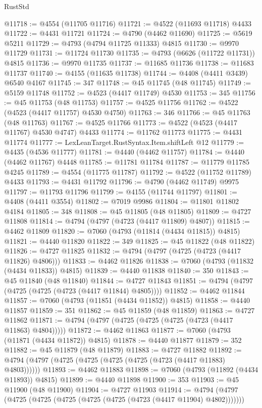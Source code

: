 \begin{lexlean}{RustStd}
\begin{coremodule}
{\begin{coremodule}
{{{{{{{{{{{{{{{{{{{{{{{{{{{{{{{{{{{{{{{{{{{{{{{{{{{{{{{{{{{{@11718 := @4554 (@11705 @11716)
@11721 := @4522 (@11693 @11718) @4433
@11722 := @4431 @11721
@11724 := @4790 (@4462 @11690)
@11725 := @5619 @5211
@11729 := @4793 (@4794 @11725 @11333) @4815
@11730 := @9970 @11729
@11731 := @11724 @11730
@11735 := @4793 (@6626 (@11722 @11731)) @4815
@11736 := @9970 @11735
@11737 := @11685 @11736
@11738 := @11683 @11737
@11740 := @4155 (@11635 @11738)
@11744 := @4408 (@4411 @3439) @6540 @4167
@11745 := 347
@11748 := @45 @11745 (@48 @11745)
@11749 := @5159 @11748
@11752 := @4523 (@4417 @11749) @4530
@11753 := 345
@11756 := @45 @11753 (@48 @11753)
@11757 := @4525 @11756
@11762 := @4522 (@4523 (@4417 @11757) @4530 @4750)
@11763 := 346
@11766 := @45 @11763 (@48 @11763)
@11767 := @4525 @11766
@11773 := @4522 (@4523 (@4417 @11767) @4530 @4747) @4433
@11774 := @11762 @11773
@11775 := @4431 @11774
@11777 := LexLeanTarget.RustSyntax.Item.shiftLeft @12
@11779 := @4435 (@4536 @11777)
@11781 := @4440 (@4462 @11757)
@11784 := @4440 (@4462 @11767) @4448
@11785 := @11781 @11784
@11787 := @11779 @11785 @4245
@11789 := @4554 (@11775 @11787)
@11792 := @4522 (@11752 @11789) @4433
@11793 := @4431 @11792
@11796 := @4790 (@4462 @11749) @9975
@11797 := @11793 @11796
@11799 := @4155 (@11744 @11797)
@11801 := @4408 (@4411 @3554)
@11802 := @7019 @9986
@11804 := @11801 @11802 @4184
@11805 := 348
@11808 := @45 @11805 (@48 @11805)
@11809 := @4727 @11808
@11814 := @4794 (@4797 (@4723 (@4417 @11809) @4807))
@11815 := @4462 @11809
@11820 := @7060 (@4793 (@11814 (@4434 @11815)) @4815)
@11821 := @4440 @11820
@11822 := 349
@11825 := @45 @11822 (@48 @11822)
@11826 := @4727 @11825
@11832 := @4794 (@4797 (@4725 (@4723 (@4417 @11826) @4806)))
@11833 := @4462 @11826
@11838 := @7060 (@4793 (@11832 (@4434 @11833)) @4815)
@11839 := @4440 @11838
@11840 := 350
@11843 := @45 @11840 (@48 @11840)
@11844 := @4727 @11843
@11851 := @4794 (@4797 (@4725 (@4725 (@4723 (@4417 @11844) @4805))))
@11852 := @4462 @11844
@11857 := @7060 (@4793 (@11851 (@4434 @11852)) @4815)
@11858 := @4440 @11857
@11859 := 351
@11862 := @45 @11859 (@48 @11859)
@11863 := @4727 @11862
@11871 := @4794 (@4797 (@4725 (@4725 (@4725 (@4723 (@4417 @11863) @4804)))))
@11872 := @4462 @11863
@11877 := @7060 (@4793 (@11871 (@4434 @11872)) @4815)
@11878 := @4440 @11877
@11879 := 352
@11882 := @45 @11879 (@48 @11879)
@11883 := @4727 @11882
@11892 := @4794 (@4797 (@4725 (@4725 (@4725 (@4725 (@4723 (@4417 @11883) @4803))))))
@11893 := @4462 @11883
@11898 := @7060 (@4793 (@11892 (@4434 @11893)) @4815)
@11899 := @4440 @11898
@11900 := 353
@11903 := @45 @11900 (@48 @11900)
@11904 := @4727 @11903
@11914 := @4794 (@4797 (@4725 (@4725 (@4725 (@4725 (@4725 (@4723 (@4417 @11904) @4802)))))))
}}}}}}}}}}}}}}}}}}}}}}}}}}}}}}}}}}}}}}}}}}}}}}}}}}}}}}}}}}}}
\end{coremodule}}
\end{coremodule}
\end{lexlean}
